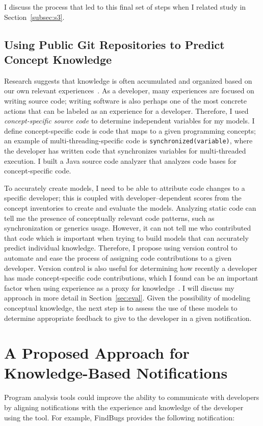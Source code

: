 \documentclass{llncs}
\begin{document}
I discuss the process that led to this final set of steps when I related study in Section~\ref{subsec:s3}.

\subsection{Using Public Git Repositories to Predict Concept Knowledge}
Research suggests that knowledge is often accumulated and organized based on our own relevant experiences~\cite{johnson1989mental,argote2011organizational}. As a developer, many experiences are focused on writing source code; writing software is also perhaps one of the most concrete actions that can be labeled as an experience for a developer. Therefore, I used \emph{concept-specific source code} to determine independent variables for my models. I define concept-specific code is code that maps to a given programming concepts; an example of multi-threading-specific code is \texttt{synchronized(variable)}, where the developer has written code that synchronizes variables for multi-threaded execution.
I built a Java source code analyzer that analyzes code bases for concept-specific code.

To accurately create models, I need to be able to attribute code changes to a specific developer; this is coupled with developer--dependent scores from the concept inventories to create and evaluate the models. Analyzing static code can tell me the presence of conceptually relevant code patterns, such as synchronization or generics usage. However, it can not tell me who contributed that code which is important when trying to build models that can accurately predict individual knowledge. 
Therefore, I propose using version control to automate and ease the process of assigning code contributions to a given developer. 
Version control is also useful for determining how recently a developer has made concept-specific code contributions, which I found can be an important factor when using experience as a proxy for knowledge~\cite{johnson2015bespoke}. %
I will discuss my approach in more detail in Section~\ref{sec:eval}.
Given the possibility of modeling conceptual knowledge, the next step is to assess the use of these models to determine appropriate feedback to give to the developer in a given notification.


\section{A Proposed Approach for Knowledge-Based Notifications}
Program analysis tools could improve the ability to communicate with developers by aligning notifications with the experience and knowledge of the developer using the tool.
For example, FindBugs provides the following notification:
\end{document}
